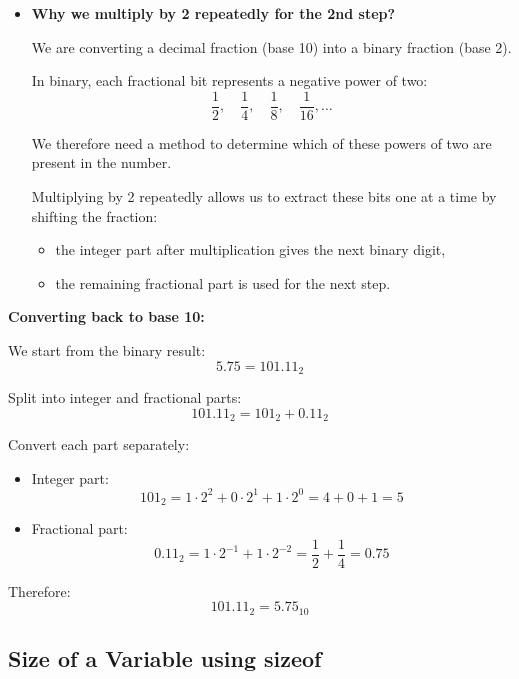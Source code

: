 \documentclass[10pt]{article}
\newcommand{\pbreak}{\vspace{30pt}}
\begin{document}
\pbreak

\begin{itemize}
\item \textbf{Why we multiply by 2 repeatedly for the 2nd step?}

We are converting a decimal fraction (base 10) into a binary fraction (base 2).

In binary, each fractional bit represents a negative power of two:
\[
\frac{1}{2}, \quad \frac{1}{4}, \quad \frac{1}{8}, \quad \frac{1}{16}, \dots
\]

We therefore need a method to determine which of these powers of two are present in the number.

Multiplying by 2 repeatedly allows us to extract these bits one at a time by shifting the fraction:
\begin{itemize}
    \item the integer part after multiplication gives the next binary digit,
    \item the remaining fractional part is used for the next step.
\end{itemize}

\end{itemize}

\pbreak

\textbf{Converting back to base 10:}

We start from the binary result:
\[
5.75 = 101.11_2
\]

Split into integer and fractional parts:
\[
101.11_2 = 101_2 + 0.11_2
\]

Convert each part separately:

\begin{itemize}
    \item Integer part:
    \[
        101_2 = 1 \cdot 2^2 + 0 \cdot 2^1 + 1 \cdot 2^0 = 4 + 0 + 1 = 5
    \]

    \item Fractional part:
    \[
        0.11_2 = 1 \cdot 2^{-1} + 1 \cdot 2^{-2} = \frac{1}{2} + \frac{1}{4} = 0.75
    \]
\end{itemize}

Therefore:
\[
101.11_2 = 5.75_{10}
\]

\newpage

\subsection{Size of a Variable using sizeof}
\end{document}
